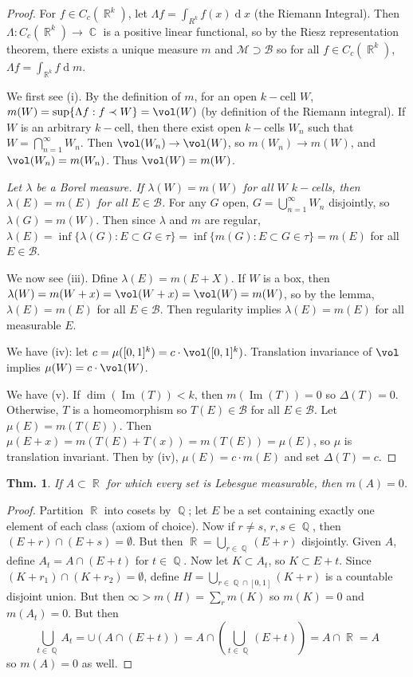 \documentclass[12pt, a4paper]{book}
\DeclareMathOperator{\Q}{\mathbb{Q}}
\DeclareMathOperator{\R}{\mathbb{R}}
\DeclareMathOperator{\C}{\mathbb{C}}
\DeclareMathOperator{\im}{Im}
\renewcommand{\d}[1]{\ensuremath{\operatorname{d}\!{#1}}} %
\newtheorem{theorem}{Thm.}[section]
\theoremstyle{nonumberplain}
\newtheorem{proof}{Proof}
\begin{document}
\begin{proof}
    For $f\in C_c(\R^k)$, let $\Lambda f=\int_{R^k}f(x)\d{x}$ (the Riemann Integral).
    Then $\Lambda:C_c(\R^k)\to\C$ is a positive linear functional, so by the Riesz representation theorem, there exists a unique measure $m$ and $\mathcal{M}\supset\mathcal{B}$ so for all $f\in C_c(\R^k)$, $\Lambda f=\int_{\R^k}f\d{m}$.

    We first see (i).
    By the definition of $m$, for an open $k-$cell $W$, $m(W)=\sup\{\Lambda f:f\prec W\}=\vol(W)$ (by definition of the Riemann integral).
    If $W$ is an arbitrary $k-$cell, then there exist open $k-$cells $W_n$ such that $W=\bigcap\limits_{n=1}^\infty W_n$.
    Then $\vol(W_n)\to\vol(W)$, so $m(W_n)\to m(W)$, and $\vol(W_n)=m(W_n)$.
    Thus $\vol(W)=m(W)$.

    \textit{Let $\lambda$ be a Borel measure.
    If $\lambda(W)=m(W)$ for all $W$ $k-$cells, then $\lambda(E)=m(E)$ for all $E\in\mathcal{B}$.}
    For any $G$ open, $G=\bigcup\limits_{n=1}^\infty W_n$ disjointly, so $\lambda(G)=m(W)$.
    Then since $\lambda$ and $m$ are regular, $\lambda(E)=\inf\{\lambda(G):E\subset G\in\tau\}=\inf\{m(G):E\subset G\in\tau\}=m(E)$ for all $E\in\mathcal{B}$.

    We now see (iii).
    Dfine $\lambda(E)=m(E+X)$.
    If $W$ is a box, then $\lambda(W)=m(W+x)=\vol(W+x)=\vol(W)=m(W)$, so by the lemma, $\lambda(E)=m(E)$ for all $E\in\mathcal{B}$.
    Then regularity implies $\lambda(E)=m(E)$ for all measurable $E$.

    We have (iv): let $c=\mu([0,1]^k)=c\cdot\vol([0,1]^k)$.
    Translation invariance of $\vol$ implies $\mu(W)=c\cdot\vol(W)$.

    We have (v).
    If $\dim(\im(T))<k$, then $m(\im(T))=0$ so $\Delta(T)=0$.
    Otherwise, $T$ is a homeomorphism so $T(E)\in\mathcal{B}$ for all $E\in\mathcal{B}$.
    Let $\mu(E)=m(T(E))$.
    Then $\mu(E+x)=m(T(E)+T(x))=m(T(E))=\mu(E)$, so $\mu$ is translation invariant.
    Then by (iv), $\mu(E)=c\cdot m(E)$ and set $\Delta(T)=c$.
\end{proof}
\begin{theorem}
    If $A\subset\R$ for which every set is Lebesgue measurable, then $m(A)=0$.
\end{theorem}
\begin{proof}
    Partition $\R$ into cosets by $\Q$; let $E$ be a set containing exactly one element of each class (axiom of choice).
    Now if $r\neq s$, $r,s\in\Q$, then $(E+r)\cap (E+s)=\emptyset$.
    But then $\R=\bigcup\limits_{r\in\Q}(E+r)$ disjointly.
    Given $A$, define $A_t=A\cap (E+t)$ for $t\in\Q$.
    Now let $K\subset A_t$, so $K\subset E+t$.
    Since $(K+r_1)\cap (K+r_2)=\emptyset$, define $H=\bigcup\limits_{r\in\Q\cap[0,1]}(K+r)$ is a countable disjoint union.
    But then $\infty>m(H)=\sum_r m(K)$ so $m(K)=0$ and $m(A_t)=0$.
    But then
    \[\bigcup\limits_{t\in\Q}A_t=\cup(A\cap(E+t))=A\cap\left(\bigcup\limits_{t\in\Q}(E+t)\right)=A\cap\R=A\]
    so $m(A)=0$ as well.
\end{proof}
\end{document}
